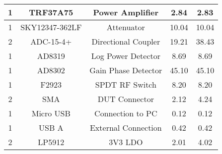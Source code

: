 \begin{table}[H]
\begin{tabular}{|c|c|c|c|c|}
		1                 & TRF37A75                   & Power Amplifier          & 2.84                                                                  & 2.83                                                                      \\ \hline
		1                 & SKY12347-362LF             & Attenuator  & 10.04                                                                 & 10.04                                                                     \\ \hline
		2                 & ADC-15-4+                  & Directional Coupler      & 19.21                                                                 & 38.43                                                                     \\ \hline
		1                 & AD8319                     & Log Power Detector       & 8.69                                                                   & 8.69                                                                       \\ \hline
		1                 & AD8302                     & Gain Phase Detector      & 45.10                                                                   & 45.10                                                                       \\ \hline
		1                 & F2923                      & SPDT RF Switch           & 8.20                                                                  & 8.20                                                                      \\ \hline
		2                 & SMA                        & DUT Connector            & 2.12                                                                  & 4.24                                                                      \\ \hline
		1                 & Micro USB                  & Connection to PC         & 0.12                                                                  & 0.12                                                                      \\ \hline
		1                 & USB A                      & External Connection & 0.42                                                                  & 0.42                                                                     \\ \hline
		2                 & LP5912                     & 3V3 LDO                  & 2.01                                                                 & 4.02                                                                     \\ \hline

\end{tabular}
\end{table}
